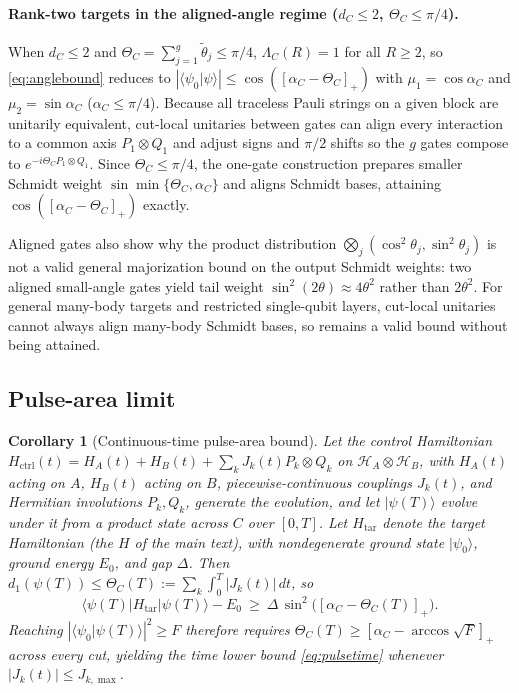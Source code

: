 \documentclass[reprint,aps,pra,floatfix,superscriptaddress,nofootinbib,longbibliography]{revtex4-2}
\newtheorem{corollary}[theorem]{Corollary}
\theoremstyle{remark}
\theoremstyle{definition}
\newcommand{\calH}{\mathcal{H}}
\newcommand{\ket}[1]{\lvert #1 \rangle}
\newcommand{\bra}[1]{\langle #1 \rvert}
\newcommand{\braket}[2]{\langle #1 \vert #2 \rangle}
\begin{document}
\paragraph{Rank-two targets in the aligned-angle regime ($d_C\le2$, $\Theta_C\le\pi/4$).}
When $d_C\le2$ and $\Theta_C=\sum_{j=1}^g\tilde\theta_j\le\pi/4$, $\Lambda_C(R)=1$
for all $R\ge2$, so \eqref{eq:anglebound} reduces to
$|\braket{\psi_0}{\psi}|\le\cos([\alpha_C-\Theta_C]_+)$ with
$\mu_1=\cos\alpha_C$ and $\mu_2=\sin\alpha_C$ ($\alpha_C\le\pi/4$). Because all
traceless Pauli strings on a given block are unitarily equivalent, cut-local
unitaries between gates can align every interaction to a common axis
$P_1\otimes Q_1$ and adjust signs and $\pi/2$ shifts so the $g$ gates compose to
$e^{-i\Theta_C P_1\otimes Q_1}$. Since $\Theta_C\le\pi/4$, the one-gate
construction prepares smaller Schmidt weight $\sin\min\{\Theta_C,\alpha_C\}$ and
aligns Schmidt bases, attaining $\cos([\alpha_C-\Theta_C]_+)$ exactly. 

Aligned gates also show why the product distribution
$\bigotimes_j(\cos^2\theta_j,\sin^2\theta_j)$ is not a valid general
majorization bound on the output Schmidt weights: two aligned small-angle gates
yield tail weight $\sin^2(2\theta)\approx4\theta^2$ rather than $2\theta^2$. For
general many-body targets and restricted single-qubit layers, cut-local unitaries
cannot always align many-body Schmidt bases, so  remains a valid
bound without being attained.

\subsection{Pulse-area limit}

\begin{corollary}[Continuous-time pulse-area bound]
\label{cor:pulse}
Let the control Hamiltonian
$H_{\mathrm{ctrl}}(t)=H_A(t)+H_B(t)+\sum_k J_k(t)P_k\otimes Q_k$ on
$\calH_A\otimes\calH_B$, with $H_A(t)$ acting on $A$, $H_B(t)$ acting on $B$,
piecewise-continuous couplings $J_k(t)$, and Hermitian involutions $P_k,Q_k$,
generate the evolution, and let $\ket{\psi(T)}$ evolve under it from a product
state across $C$ over $[0,T]$. Let $H_{\mathrm{tar}}$ denote the target
Hamiltonian (the $H$ of the main text), with nondegenerate ground state
$\ket{\psi_0}$, ground energy $E_0$, and gap $\Delta$. Then
$d_1(\psi(T))\le\Theta_C(T):=\sum_k\int_0^T|J_k(t)|\,dt$, so
\begin{equation}
  \bra{\psi(T)}H_{\mathrm{tar}}\ket{\psi(T)}-E_0\ \ge\ \Delta\,\sin^2\bigl([\alpha_C-\Theta_C(T)]_+\bigr).
\end{equation}
Reaching $|\braket{\psi_0}{\psi(T)}|^2\ge F$ therefore requires
$\Theta_C(T)\ge[\alpha_C-\arccos\sqrt{F}]_+$ across every cut, yielding the time
lower bound \eqref{eq:pulsetime} whenever $|J_k(t)|\le J_{k,\max}$.
\end{corollary}
\end{document}
